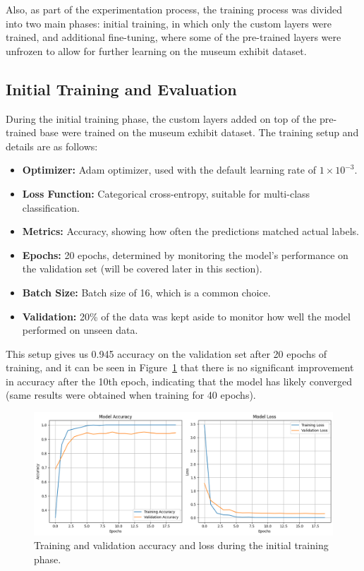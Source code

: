 Also, as part of the experimentation process, the training process was divided into two main phases: initial training, in which only the custom layers were trained, and additional fine-tuning, where some of the pre-trained layers were unfrozen to allow for further learning on the museum exhibit dataset.

\subsection{Initial Training and Evaluation}

During the initial training phase, the custom layers added on top of the pre-trained base were trained on the museum exhibit dataset. The training setup and details are as follows:

\begin{itemize}
   \item \textbf{Optimizer:} Adam optimizer, used with the default learning rate of \(1 \times 10^{-3}\).
   \item \textbf{Loss Function:} Categorical cross-entropy, suitable for multi-class classification.
   \item \textbf{Metrics:} Accuracy, showing how often the predictions matched actual labels.
   \item \textbf{Epochs:} 20 epochs, determined by monitoring the model's performance on the validation set (will be covered later in this section).
   \item \textbf{Batch Size:} Batch size of 16, which is a common choice.
   \item \textbf{Validation:} 20\% of the data was kept aside to monitor how well the model performed on unseen data.
\end{itemize}

This setup gives us 0.945 accuracy on the validation set after 20 epochs of training, and it can be seen in Figure~\ref{fig:initial_training} that there is no significant improvement in accuracy after the 10th epoch, indicating that the model has likely converged (same results were obtained when training for 40 epochs).

\begin{figure}[h]
    \centering
    \includegraphics[width=1.0\textwidth]{img/initial-training.png}
    \caption{Training and validation accuracy and loss during the initial training phase.}\label{fig:initial_training}
\end{figure}

